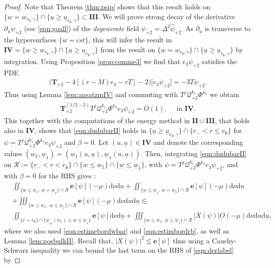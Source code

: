 \documentclass[reqno]{amsart}
\numberwithin{equation}{section}
\newcommand{\quatre}{\mathbf{IV}}
\newcommand{\mcq}{\mathcal{Q}}
\newcommand{\mcr}{\mathcal{R}}
\newcommand{\wbar}{\underline{w}}
\newcommand{\ubar}{{\underline{u}}}
\newcommand{\carterp}{\mcq_{+2}}
\newcommand{\dee}{\mathrm{d}}
\newcommand{\ener}{\mathbf{e}}
\newcommand{\teuk}{\mathbf{T}}
\newcommand{\Psihat}{\widehat{\psi}}
\newcommand{\deux}{\mathbf{II}}
\newcommand{\trois}{\mathbf{III}}
\newcommand{\rb}{r_\mathfrak{b}}
\newcommand{\psip}{\psi_{+2}}
\newcommand{\Psihatp}{\Psihat_{+2}}
\theoremstyle{plain}
\theoremstyle{definition}
\theoremstyle{remark}
\numberwithin{equation}{section}
\begin{document}
\begin{proof}
    Note that Theorem \ref{thm:psip} shows that this result holds on $\{w=  w_{\rb,\gamma}\}\cap\{\ubar\geq\ubar_{\rb,\gamma}\}\subset\trois$. {We will prove strong decay of the derivative $\partial_u\psip$ (see \eqref{eqn:goall}) of the \textit{degenerate} field $\psip=\Delta^2\Psihatp$. As $\partial_u$ is transverse to the hypersurfaces $\{w=cst\}$, this will infer the result in $\quatre=\{w\geq  w_{\rb,\gamma}\}\cap\{\ubar\geq\ubar_{\rb,\gamma}\}$ from the result on $\{w=  w_{\rb,\gamma}\}\cap\{\ubar\geq\ubar_{\rb,\gamma}\}$ by integration.} Using Proposition \ref{prop:comme3} 
    we find that $e_3\psip$ satisfies the PDE 
\begin{align}\label{eqn:inundd}
    \Big(\teuk_{+2}-4[(r-M)e_3-rT]-2\Big)\Big[e_3\psip\Big]=-3T\psip.
\end{align}
Thus using Lemma \ref{lem:ansatzmIV} and commuting with $T^j\carterp^{k_1}\Phi^{k_2}$ we obtain 
\begin{align}\label{eqn:inun2}
    \teuk_{+2}^{(1/2,-2)}T^j\carterp^{k_1}\Phi^{k_2}e_3\psip=O(1),\quad\text{  in  }\quatre.
\end{align}
This together with the computations of the energy method in $\deux\cup\trois$, that holds also in $\quatre$, shows that \eqref{eqn:dudubarII} holds in $\{\ubar\geq\ubar_{\rb,\gamma}\}\cap\{r_-<r\leq\rb\}$ for $\psi=T^j\carterp^{k_1}\Phi^{k_2}e_3\psip$ and $\beta=0$. Let $(u,\ubar)\in\quatre$ and denote the corresponding values $(w_1,\wbar_1)=(w_1(u,\ubar),\wbar_1(u,\ubar))$. Then, integrating \eqref{eqn:dudubarII} on $\mcr:=\{r_-<r<\rb\}\cap \{w\leq w_1\}\cap\{\wbar\leq\wbar_1\}$, with $\psi=T^j\carterp^{k_1}\Phi^{k_2}e_3\psip$, and with $\beta=0$ for the RHS gives :
\begin{align}
        &\iint_{\{w\leq w_1,\:\wbar=\wbar_1\}\cap\mcr}{\ener}[\psi](-\mu)\dee\nu\dee u+\iint_{\{\wbar\leq \wbar_1,\:w=w_1\}\cap\mcr}\ener[\psi](-\mu)\dee\nu\dee u\nonumber\\
        &+\iiint_{\{w\leq w_1,\:\wbar\leq\wbar_1\}\cap\mcr}\ener[\psi](-\mu)\dee\nu\dee u\dee\ubar\lesssim\nonumber\\
        &\iint_{\{r=\rb\}\cap\{\wbar_{\rb}(w_1)\leq\wbar\leq\wbar_1\}}\ener[\psi]\dee\nu\dee\ubar+\iiint_{\{w\leq w_1,\:\wbar\leq\wbar_1\}\cap\mcr}|X(\psi)|O(-\mu)\dee\nu\dee u\dee\ubar,\label{eqn:derlabel}
\end{align}
where we also used \eqref{eqn:estimebordwbar} and \eqref{eqn:estimbordrb}, as well as Lemma \ref{lem:posbulkII}.
Recall that, $|X(\psi)|^2\lesssim\ener[\psi]$ thus using a Cauchy-Schwarz inequality we can bound the last term on the RHS of \eqref{eqn:derlabel} by

\end{proof}
\end{document}

